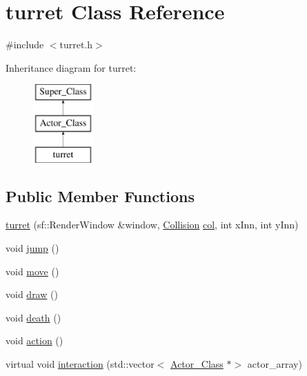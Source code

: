 \hypertarget{classturret}{}\section{turret Class Reference}
\label{classturret}


{\ttfamily \#include $<$turret.\+h$>$}

Inheritance diagram for turret\+:\begin{figure}[H]
\begin{center}
\leavevmode
\includegraphics[height=3.000000cm]{classturret}
\end{center}
\end{figure}
\subsection*{Public Member Functions}
\begin{DoxyCompactItemize}
\item 
\hyperlink{classturret_a823a5097ec87437c889ea7bf5878dd12}{turret} (sf\+::\+Render\+Window \&window, \hyperlink{class_collision}{Collision} \hyperlink{classturret_a7a0448d6a1fdbe3d817dfad07a77fee6}{col}, int x\+Inn, int y\+Inn)
\item 
void \hyperlink{classturret_a6c97760cdfa379ce956c3f5d773c9f4e}{jump} ()
\item 
void \hyperlink{classturret_a814fbc1d3c0ea9e10b9ec1edb3e5f734}{move} ()
\item 
void \hyperlink{classturret_ae396c3a39ef7556070e1a0b55bea2970}{draw} ()
\item 
void \hyperlink{classturret_a51ac1a996e5139a03f331c382d136a95}{death} ()
\item 
void \hyperlink{classturret_a883048366044ccc7abd00a7f57400d2a}{action} ()
\item 
virtual void \hyperlink{classturret_aa6733d8f9b2d5773271a1ed3b4b88aab}{interaction} (std\+::vector$<$ \hyperlink{class_actor___class}{Actor\+\_\+\+Class} $\ast$$>$ actor\+\_\+array)
\end{DoxyCompactItemize}
